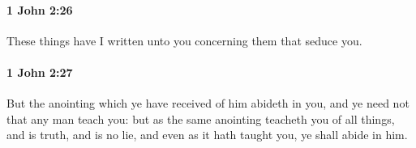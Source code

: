 		\paragraph{1 John 2:26} %
			\label{1JOHN-2-26}

			These things have I written unto you concerning them that seduce you.

			\begin{framed}
			\scriptsize
				\begin{compactdesc}
					\item[SBLG] 
				\end{compactdesc}
			\end{framed}

		\paragraph{1 John 2:27} %
			\label{1JOHN-2-27}

			But the anointing which ye have received of him abideth in you, and ye need not that any man teach you: but as the same anointing teacheth you of all things, and is truth, and is no lie, and even as it hath taught you, ye shall abide in him.

